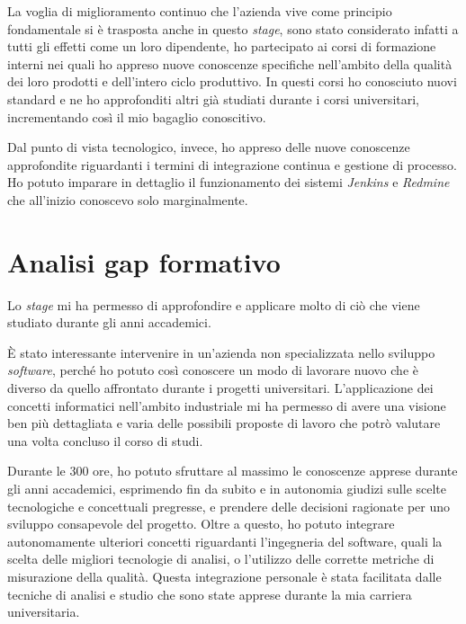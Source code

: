 \bigskip

La voglia di miglioramento continuo che l'azienda vive come principio fondamentale si è trasposta anche in questo \textit{stage}, sono stato considerato infatti a tutti gli effetti come un loro dipendente, ho partecipato ai corsi di formazione interni nei quali ho appreso nuove conoscenze specifiche nell'ambito della qualità dei loro prodotti e dell'intero ciclo produttivo. In questi corsi ho conosciuto nuovi standard e ne ho approfonditi altri già studiati durante i corsi universitari, incrementando così il mio bagaglio conoscitivo.

\bigskip

Dal punto di vista tecnologico, invece, ho appreso delle nuove conoscenze approfondite riguardanti i termini di integrazione continua e gestione di processo. Ho potuto imparare in dettaglio il funzionamento dei sistemi \textit{Jenkins} e \textit{Redmine} che all'inizio conoscevo solo marginalmente.

\section{Analisi gap formativo}

Lo \textit{stage} mi ha permesso di approfondire e applicare molto di ciò che viene studiato durante gli anni accademici.


È stato interessante intervenire in un'azienda non specializzata nello sviluppo \textit{software}, perché ho potuto così conoscere un modo di lavorare nuovo che è diverso da quello affrontato durante i progetti universitari. L'applicazione dei concetti informatici nell'ambito industriale mi ha permesso di avere una visione ben più dettagliata e varia delle possibili proposte di lavoro che potrò valutare una volta concluso il corso di studi. 

Durante le 300 ore, ho potuto sfruttare al massimo le conoscenze apprese durante gli anni accademici, esprimendo fin da subito e in autonomia giudizi sulle scelte tecnologiche e concettuali pregresse, e prendere delle decisioni ragionate per uno sviluppo consapevole del progetto. Oltre a questo, ho potuto integrare autonomamente ulteriori concetti riguardanti l'ingegneria del software, quali la scelta delle migliori tecnologie di analisi, o l'utilizzo delle corrette metriche di misurazione della qualità. Questa integrazione personale è stata facilitata dalle tecniche di analisi e studio che sono state apprese durante la mia carriera universitaria.


